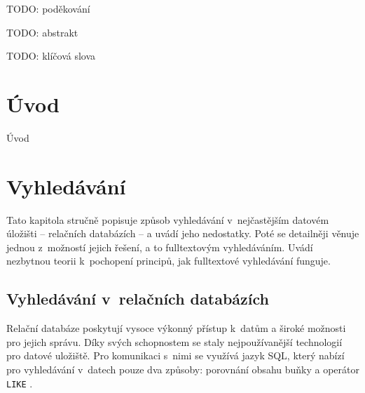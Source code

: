 \documentclass[11pt,oneside]{fithesis2}
\begin{document}
\FrontMatter
\ThesisTitlePage

\begin{ThesisDeclaration}
  \DeclarationText
  \AdvisorName
\end{ThesisDeclaration}

\begin{ThesisThanks}
TODO: poděkování
\end{ThesisThanks}

\begin{ThesisAbstract}
TODO: abstrakt
\end{ThesisAbstract}

\begin{ThesisKeyWords}
TODO: klíčová slova
\end{ThesisKeyWords}

\MainMatter

\tableofcontents



\chapter{Úvod}
Úvod

\chapter{Vyhledávání}
Tato kapitola stručně popisuje způsob vyhledávání v~nejčastějším datovém úložišti -- relačních databázích -- a uvádí jeho nedostatky. Poté se detailněji věnuje jednou z~možností jejich řešení, a to fulltextovým vyhledáváním. Uvádí nezbytnou 
teorii k~pochopení principů, jak fulltextové vyhledávání funguje.

\section{Vyhledávání v~relačních databázích}
Relační databáze poskytují vysoce výkonný přístup k~datům a široké možnosti pro jejich správu. Díky svých schopnostem se staly nejpoužívanější technologií pro datové uložiště. Pro komunikaci s~nimi se využívá jazyk SQL, který nabízí pro vyhledávání v~datech pouze dva způsoby: porovnání obsahu buňky a operátor \texttt{LIKE} \cite{MistrovstviMySQL}.
\end{document}
